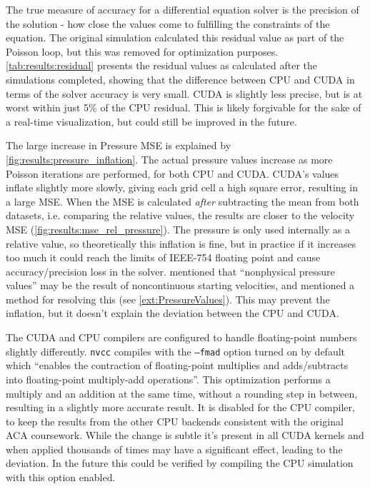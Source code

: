 

The true measure of accuracy for a differential equation solver is the precision of the solution - how close the values come to fulfilling the constraints of the equation.
The original simulation calculated this residual value as part of the Poisson loop, but this was removed for optimization purposes.
\cref{tab:results:residual} presents the residual values as calculated after the simulations completed, showing that the difference between CPU and CUDA in terms of the solver accuracy is very small.
CUDA is slightly less precise, but is at worst within just 5\% of the CPU residual.
This is likely forgivable for the sake of a real-time visualization, but could still be improved in the future.




The large increase in Pressure MSE is explained by \cref{fig:results:pressure_inflation}.
The actual pressure values increase as more Poisson iterations are performed, for both CPU and CUDA.
CUDA's values inflate slightly more slowly, giving each grid cell a high square error, resulting in a large MSE.
When the MSE is calculated \emph{after} subtracting the mean from both datasets, i.e. comparing the relative values, the results are closer to the velocity MSE (\cref{fig:results:mse_rel_pressure}).
The pressure is only used internally as a relative value, so theoretically this inflation is fine, but in practice if it increases too much it could reach the limits of IEEE-754 floating point\cite{IEEEFloat75419} and cause accuracy/precision loss in the solver.
\cite{book:griebel1998numerical} mentioned that ``nonphysical pressure values'' may be the result of noncontinuous starting velocities, and mentioned a method for resolving this (see \cref{ext:PressureValues}). This may prevent the inflation, but it doesn't explain the deviation between the CPU and CUDA.

The CUDA and CPU compilers are configured to handle floating-point numbers slightly differently.
\texttt{nvcc} compiles with the \texttt{--fmad} option turned on by default\cite{NvccFmad} which ``enables the contraction of floating-point multiplies and adds/subtracts into floating-point multiply-add operations''.
This optimization performs a multiply and an addition at the same time, without a rounding step in between, resulting in a slightly more accurate result\cite{NvidiaFMAJustification}.
It is disabled for the CPU compiler, to keep the results from the other CPU backends consistent with the original ACA coursework.
While the change is subtle it's present in all CUDA kernels and when applied thousands of times may have a significant effect, leading to the deviation.
In the future this could be verified by compiling the CPU simulation with this option enabled.

